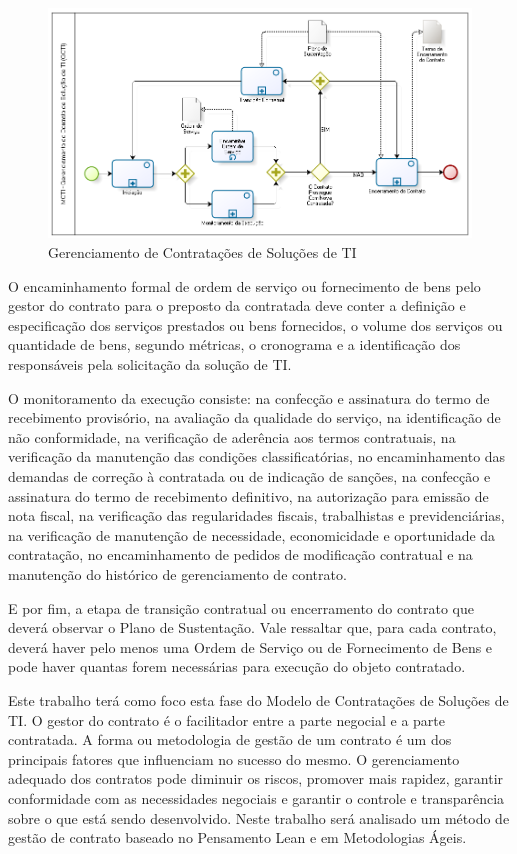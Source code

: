 \begin{figure}[H]
		\centering
		\label{fig05}
			\includegraphics[scale=0.6]{figuras/GCTI.png}
		\caption{Gerenciamento de Contratações de Soluções de TI   \cite{mcti}}
\end{figure}



O encaminhamento formal de ordem de serviço ou fornecimento de bens pelo gestor do contrato para o preposto da contratada deve conter a definição e especificação dos serviços prestados ou bens fornecidos, o volume dos serviços ou quantidade de bens, segundo métricas, o cronograma e a identificação dos responsáveis pela solicitação da solução de TI. 

O monitoramento da execução consiste: na confecção e assinatura do termo de recebimento provisório, na avaliação da qualidade do serviço, na identificação de não conformidade, na verificação de aderência aos termos contratuais, na verificação da manutenção das condições classificatórias, no encaminhamento das demandas de correção à contratada ou de indicação de sanções, na confecção e assinatura do termo de recebimento definitivo, na autorização para emissão de nota fiscal, na verificação das regularidades fiscais, trabalhistas e previdenciárias, na verificação de manutenção de necessidade, economicidade e oportunidade da contratação, no encaminhamento de pedidos de modificação contratual e na manutenção do histórico de gerenciamento de contrato. 

E por fim, a etapa de transição contratual ou encerramento do contrato que deverá observar o Plano de Sustentação. Vale ressaltar que, para cada contrato, deverá haver pelo menos uma Ordem de Serviço ou de Fornecimento de Bens e pode haver quantas forem necessárias para execução do objeto contratado.

Este trabalho terá como foco esta fase do Modelo de Contratações de Soluções de TI. O gestor do contrato é o facilitador entre a parte negocial e a parte contratada. A forma ou metodologia de gestão de um contrato é um dos principais fatores que influenciam no sucesso do mesmo. O gerenciamento adequado dos contratos pode diminuir os riscos, promover mais rapidez, garantir conformidade com as necessidades negociais e garantir o controle e transparência sobre o que está sendo desenvolvido. Neste trabalho será analisado um método de gestão de contrato baseado no Pensamento Lean e em Metodologias Ágeis.

